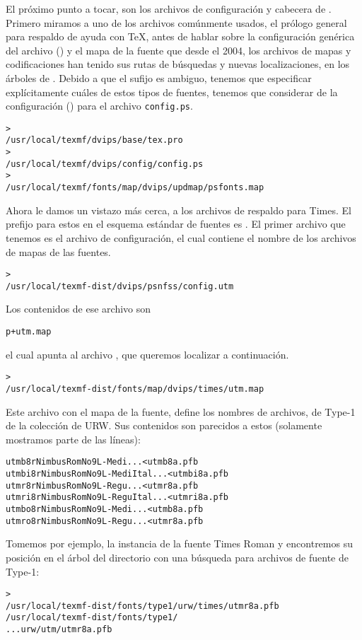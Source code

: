 \documentclass{article}
\begin{document}
El próximo punto a tocar, son los archivos de configuración y cabecera de
. Primero miramos a uno de los archivos comúnmente usados, el prólogo
general  para respaldo de ayuda con \TeX{}, antes de hablar sobre la
configuración genérica del archivo () y el mapa  de
la fuente \PS{}\Dash que desde el 2004, los archivos de mapas y
codificaciones han tenido
sus rutas de búsquedas y nuevas localizaciones, en los árboles de .
Debido a que el sufijo  es ambiguo, tenemos que especificar explícitamente
cuáles de estos tipos de fuentes, tenemos que considerar de la configuración
() para el archivo \texttt{config.ps}.
\begin{alltt}
> 
   /usr/local/texmf/dvips/base/tex.pro
> 
   /usr/local/texmf/dvips/config/config.ps
> 
   /usr/local/texmf/fonts/map/dvips/updmap/psfonts.map
\end{alltt}

Ahora le damos un vistazo más cerca, a los archivos de respaldo \PS{} para 
Times. El prefijo para estos en el esquema estándar de fuentes es . El
primer archivo que tenemos es el archivo de configuración, el cual contiene el nombre
de los archivos de mapas de las fuentes. 
\begin{alltt}
> 
   /usr/local/texmf-dist/dvips/psnfss/config.utm
\end{alltt}
Los contenidos de ese archivo son 
\begin{alltt}
	p +utm.map
\end{alltt}
el cual apunta al archivo , que queremos localizar a continuación.
\begin{alltt}
> 
   /usr/local/texmf-dist/fonts/map/dvips/times/utm.map
\end{alltt}
Este archivo con el mapa de la fuente, define los nombres de archivos, de Type-1 de la
colección de URW. Sus contenidos son parecidos a estos (solamente mostramos parte de
las líneas):
\begin{alltt}
utmb8r  NimbusRomNo9L-Medi    ... <utmb8a.pfb
utmbi8r NimbusRomNo9L-MediItal... <utmbi8a.pfb
utmr8r  NimbusRomNo9L-Regu    ... <utmr8a.pfb
utmri8r NimbusRomNo9L-ReguItal... <utmri8a.pfb
utmbo8r NimbusRomNo9L-Medi    ... <utmb8a.pfb
utmro8r NimbusRomNo9L-Regu    ... <utmr8a.pfb
\end{alltt}
Tomemos por ejemplo, la instancia de la fuente Times Roman
 y encontremos su posición en el árbol del directorio
 con una búsqueda para archivos de fuente de Type-1:
\begin{alltt}
	> 
\ifSingleColumn   /usr/local/texmf-dist/fonts/type1/urw/times/utmr8a.pfb
\else   /usr/local/texmf-dist/fonts/type1/                              
... urw/utm/utmr8a.pfb                                                 
\fi\end{alltt}
\end{document}
